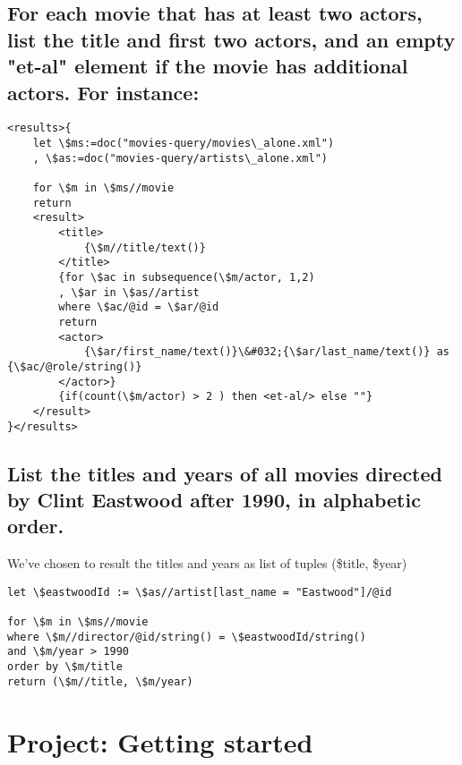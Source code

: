 \documentclass{article}
\begin{document}
\subsection{ For each movie that has at least two actors, list the
  title and first two actors, and an empty "et-al" element if the
  movie has additional actors. For instance: }
\begin{lstlisting}
<results>{
    let \$ms:=doc("movies-query/movies\_alone.xml")
    , \$as:=doc("movies-query/artists\_alone.xml")
    
    for \$m in \$ms//movie
    return
    <result>
        <title>
            {\$m//title/text()}             
        </title>
        {for \$ac in subsequence(\$m/actor, 1,2)
        , \$ar in \$as//artist 
        where \$ac/@id = \$ar/@id 
        return 
        <actor>                                                                                                                          
            {\$ar/first_name/text()}\&#032;{\$ar/last_name/text()} as  {\$ac/@role/string()}
        </actor>}
        {if(count(\$m/actor) > 2 ) then <et-al/> else ""}
    </result>
}</results>
\end{lstlisting}

\subsection{ List the titles and years of all movies directed by Clint
  Eastwood after 1990, in alphabetic order.  }

We've chosen to result the titles and years as list of tuples (\$title, \$year)
\begin{lstlisting}
let \$eastwoodId := \$as//artist[last_name = "Eastwood"]/@id

for \$m in \$ms//movie
where \$m//director/@id/string() = \$eastwoodId/string()
and \$m/year > 1990
order by \$m/title
return (\$m//title, \$m/year)
\end{lstlisting}

\section{Project: Getting started}
\end{document}

